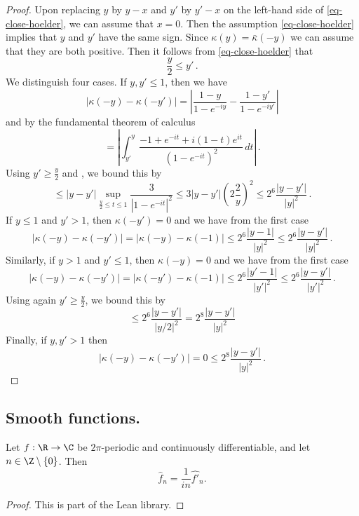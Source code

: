 \begin{proof}
\leanok
    Upon replacing $y$ by $y-x$ and $y'$ by $y'-x$ on the left-hand side of \eqref{eq-close-hoelder}, we can assume that $x = 0$. Then the assumption \eqref{eq-close-hoelder} implies that $y$ and $y'$ have the same sign. Since $\kappa(y) = \bar \kappa(-y)$ we can assume that they are both positive. Then it follows from \eqref{eq-close-hoelder} that
    $$
        \frac{y}{2} \le y' \,.
    $$
    We distinguish four cases. If $y, y' \le 1$, then we have
    $$
        |\kappa(-y) - \kappa(-y')| = \left| \frac{1 - y}{1- e^{-iy}} - \frac{1 - y'}{1- e^{-iy'}}\right|
    $$
    and by the fundamental theorem of calculus
    $$
        = \left| \int_{y'}^{y} \frac{-1 + e^{-it} + i(1-t)e^{it}}{(1 - e^{-it})^2} \,dt \right|\,.
    $$
    Using $y' \ge \frac{y}{2}$ and , we bound this by
    $$
        \le |y - y'| \sup_{\frac{y}{2} \le t \le 1} \frac{3}{|1 - e^{-it}|^2} \le 3 |y-y'| (2 \frac{2}{y})^2 \le 2^{6} \frac{|y-y'|}{|y|^2}\,.
    $$
    If $y \le 1$ and $y' > 1$, then $\kappa(-y') = 0$ and we have from the first case
    $$
        |\kappa(-y) - \kappa(-y')| = |\kappa(-y) - \kappa(-1)| \le 2^{6} \frac{|y-1|}{|y|^2} \le 2^{6} \frac{|y-y'|}{|y|^2}\,.
    $$
    Similarly, if $y > 1$ and $y' \le 1$, then $\kappa(-y) = 0$ and we have from the first case
    $$
        |\kappa(-y) - \kappa(-y')| = |\kappa(-y') - \kappa(-1)| \le 2^{6} \frac{|y'-1|}{|y'|^2} \le 2^{6} \frac{|y-y'|}{|y'|^2}\,.
    $$
    Using again $y' \ge \frac{y}{2}$, we bound this by
    $$
        \le 2^{6} \frac{|y-y'|}{|y / 2|^2} = 2^{8} \frac{|y-y'|}{|y|^2}
    $$
    Finally, if $y, y' > 1$ then
    $$
        |\kappa(-y) - \kappa(-y')| = 0 \le 2^{8} \frac{|y-y'|}{|y|^2}\,.
    $$
\end{proof}






\subsection{Smooth functions.}
\label{10smooth}
\begin{lemma}
\label{fourier-coeff-derivative}
\leanok
{}
Let $f:\R \to \C$ be $2\pi$-periodic and continuously differentiable, and let $n \in \Z \setminus \{0\}$. Then
\begin{equation}
    \widehat{f}_n = \frac{1}{i n} \widehat{f'}_n.
\end{equation}
\end{lemma}
\begin{proof}
\leanok
This is part of the Lean library.
\end{proof}

